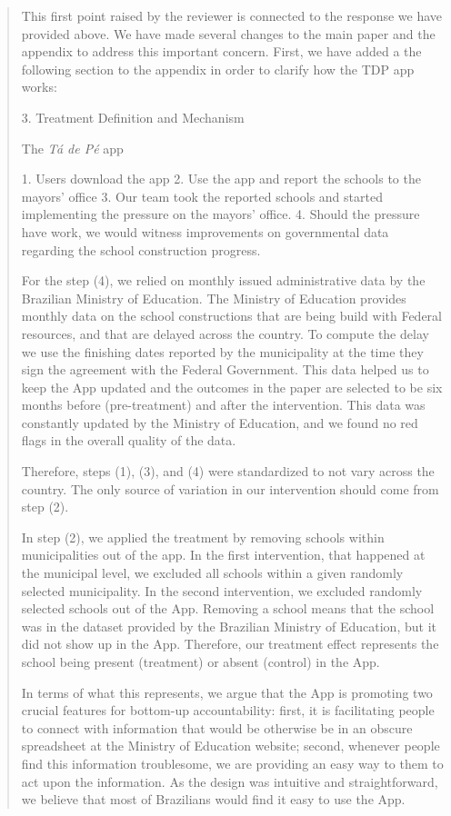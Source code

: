 \documentclass[12pt,a4paper,]{article}
\begin{document}
\begin{quotation}
This first point raised by the reviewer is connected to the response we have
provided above. We have made several changes to the main paper and the appendix
to address this important concern. First, we have added a the following section
to the appendix in order to clarify how the TDP app works:

\vspace{.5cm}

3. Treatment Definition and Mechanism

The \textit{Tá de Pé} app

1. Users download the app
2. Use the app and report the schools to the mayors' office
3. Our team took the reported schools and started implementing the pressure
on the mayors' office.
4. Should the pressure have work, we would witness improvements on governmental
     data regarding the school construction progress. 

For the step (4), we relied on monthly issued administrative data by the
Brazilian Ministry of Education. The Ministry of Education provides monthly
data on the school constructions that are being build with Federal resources,
and that are delayed across the country. To compute the delay we use the
finishing dates reported by the municipality at the time they sign the
agreement with the Federal Government. This data helped us to keep the App
updated and the outcomes in the paper are selected to be six months before
(pre-treatment) and after the intervention. This data was constantly updated by
the Ministry of Education, and we found no red flags in the overall quality of
the data.

Therefore, steps (1), (3), and (4) were standardized to not vary across the
country. The only source of variation in our intervention should come from step
(2).

In step (2), we applied the treatment by removing schools within municipalities
out of the app. In the first intervention, that happened at the municipal
level, we excluded all schools within a given randomly selected municipality.
In the second intervention, we excluded randomly selected schools out of the
App. Removing a school means that the school was in the dataset provided by the
Brazilian Ministry of Education, but it did not show up in the App. Therefore,
our treatment effect represents the school being present (treatment) or absent
(control) in the App.

In terms of what this represents, we argue that the App is promoting two
crucial features for bottom-up accountability: first, it is facilitating people
to connect with information that would be otherwise be in an obscure
spreadsheet at the Ministry of Education website; second, whenever people find
this information troublesome, we are providing an easy way to them to act upon
the information. As the design was intuitive and straightforward, we believe
that most of Brazilians would find it easy to use the App.


\end{quotation}
\end{document}
